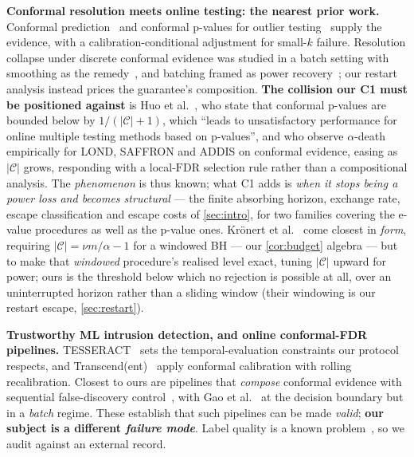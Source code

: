 \documentclass[conference]{IEEEtran}
\newcommand{\Cal}{\mathcal{C}}
\newcommand{\nCal}{\lvert\Cal\rvert}
\newcommand{\FDR}{\mathrm{FDR}}
\begin{document}
\textbf{Conformal resolution meets online testing: the nearest prior work.} Conformal
prediction~\cite{vovk2005alrw} and conformal p-values for outlier testing~\cite{bates2023outliers}
supply the evidence, with a calibration-conditional adjustment for small-$k$ failure. Resolution
collapse under discrete conformal evidence was studied in a batch setting with smoothing as the
remedy~\cite{hennhofer2026resolution}, and batching framed as power recovery~\cite{zrnic2020batching};
our restart analysis instead prices the guarantee's composition.
\textbf{The collision our C1 must be positioned against} is Huo et al.~\cite{huo2024realtime}, who
state that conformal p-values are bounded below by $1/(\nCal+1)$, which ``leads to unsatisfactory
performance for online multiple testing methods based on p-values'', and who observe $\alpha$-death
empirically for LOND, SAFFRON and ADDIS on conformal evidence, easing as $\nCal$ grows, responding with
a local-$\FDR$ selection rule rather than a compositional analysis. The \emph{phenomenon} is thus
known; what C1 adds is \emph{when it stops being a power loss and becomes structural} --- the finite
absorbing horizon, exchange rate, escape classification and escape costs of \cref{sec:intro}, for two
families covering the e-value procedures as well as the p-value ones. Krönert et
al.~\cite{kronert2024fdr} come closest in \emph{form}, requiring $\nCal = \nu m/\alpha - 1$ for a
windowed BH --- our \cref{cor:budget} algebra --- but to make that \emph{windowed} procedure's realised
level exact, tuning $\nCal$ upward for power; ours is the threshold below which no rejection is possible
at all, over an uninterrupted horizon rather than a sliding window (their windowing is our restart
escape, \cref{sec:restart}).

\textbf{Trustworthy ML intrusion detection, and online conformal-FDR pipelines.} TESSERACT~\cite{pendlebury2019tesseract}
sets the temporal-evaluation constraints our protocol respects, and
Transcend(ent)~\cite{jordaney2017transcend,barbero2022transcendent} apply conformal calibration with
rolling recalibration. Closest to ours are pipelines that \emph{compose} conformal evidence with
sequential false-discovery
control~\cite{rebjock2021online,farzaneh2025coad,wang2025multilayer,caliburn2026}, with Gao et
al.~\cite{gao2026boundary} at the decision boundary but in a \emph{batch} regime. These establish that
such pipelines can be made \emph{valid}; \textbf{our subject is a different \emph{failure mode}}. Label
quality is a known problem~\cite{engelen2021troubleshooting,liu2022error}, so we audit against an
external record.
\end{document}
